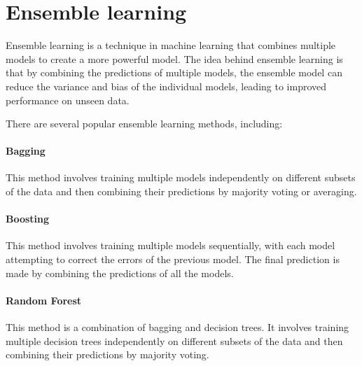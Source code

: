 

\section{Ensemble learning}
Ensemble learning \cite{Ho2009, Sklansky2013} is a technique in machine learning that combines multiple models to create a more powerful model.
The idea behind ensemble learning is that by combining the predictions of multiple models, the ensemble model can reduce the variance and bias of the individual models, leading to improved performance on unseen data.

There are several popular ensemble learning methods, including:

\paragraph{Bagging} This method involves training multiple models independently on different subsets of the data and then combining their predictions by majority voting or averaging.

\paragraph{Boosting} This method involves training multiple models sequentially, with each model attempting to correct the errors of the previous model. The final prediction is made by combining the predictions of all the models.

\paragraph{Random Forest} This method is a combination of bagging and decision trees. It involves training multiple decision trees independently on different subsets of the data and then combining their predictions by majority voting.

